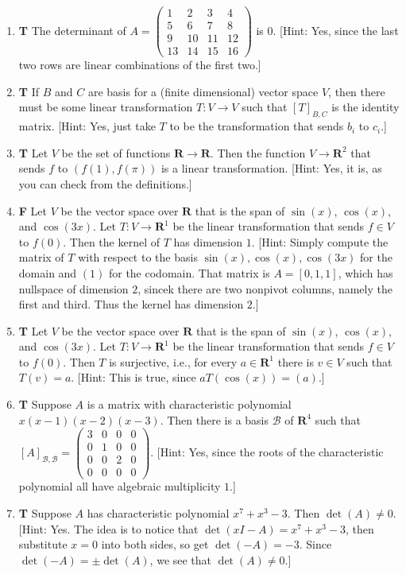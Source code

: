 \documentclass[10pt]{article}
\newcommand{\tf}[3]{\item {\bf {\color{blue}\hspace{1em}#1}}\hspace{1em} #2 [Hint: #3]}
\newcommand{\R}{\mathbf{R}}
\begin{document}
\begin{enumerate}
\tf{T}{The determinant of $A=\left(\begin{array}{rrrr}
1 & 2 & 3 & 4 \\
5 & 6 & 7 & 8 \\
9 & 10 & 11 & 12 \\
13 & 14 & 15 & 16
\end{array}\right)$ is $0$.}{Yes, since the last two rows are linear combinations of the first two.}

\tf{T}{If $B$ and $C$ are basis for a (finite dimensional) vector space $V$, then there must be some linear transformation
$T:V\to V$ such that $[T]_{B,C}$ is the identity matrix.}{Yes, just take $T$ to be the transformation
that sends $b_i$ to $c_i$.}

\tf{T}{Let $V$ be the set of functions $\R\to\R$.  Then the function $V\to \R^2$ that sends $f$ to $(f(1), f(\pi))$
is a linear transformation.}{Yes, it is, as you can check from the definitions.}

\tf{F}{Let $V$ be the vector space over $\R$ that is the span of $\sin(x)$, $\cos(x)$, and $\cos(3x)$.
Let $T:V\to \R^1$ be the linear transformation that sends $f\in V$ to $f(0)$.
Then the kernel of $T$ has dimension $1$.}{Simply compute the matrix of $T$ with respect to the basis
$\sin(x), \cos(x), \cos(3x)$ for the domain and $(1)$ for the codomain.  That matrix
is $A = [0,1,1]$, which has nullspace of dimension $2$, sincek there are two nonpivot
columns, namely the first and third. Thus the kernel has dimension $2$.}

\tf{T}{Let $V$ be the vector space over $\R$ that is the span of $\sin(x)$, $\cos(x)$, and $\cos(3x)$.
Let $T:V\to \R^1$ be the linear transformation that sends $f\in V$ to $f(0)$.
Then $T$ is surjective, i.e., for every $a\in \R^1$ there is $v\in V$ such that $T(v)=a$.}
{This is true, since $aT(\cos(x))=(a)$.}

\tf{T}{Suppose $A$ is a matrix with characteristic polynomial $x(x-1)(x-2)(x-3)$. Then
there is a basis $\mathcal{B}$ of $\R^4$ such that
$[A]_{\mathcal{B},\mathcal{B}} = \left(\begin{array}{rrrr}
3 & 0 & 0 & 0 \\
0 & 1 & 0 & 0 \\
0 & 0 & 2 & 0 \\
0 & 0 & 0 & 0
\end{array}\right).$}{Yes, since the roots of the characteristic polynomial all
have algebraic multiplicity $1$.}

\tf{T}{Suppose $A$ has characteristic polynomial $x^{7} + x^3 - 3$.  Then $\det(A)\neq 0$.}
{Yes. The idea is to notice that $\det(xI-A) = x^7+x^3 -3$, then substitute $x=0$ into both
sides, so get $\det(-A) = -3$.  Since $\det(-A)=\pm \det(A)$, we see that $\det(A)\neq 0$.}

\end{enumerate}
\end{document}
